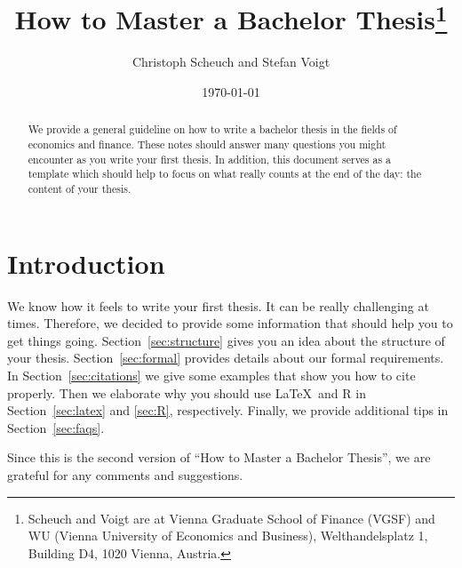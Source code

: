 \documentclass[a4paper, 12pt]{article}
\begin{document}
	\title{\textbf{How to Master a Bachelor Thesis}\thanks{Scheuch and Voigt are at Vienna Graduate School of Finance (VGSF) and WU (Vienna University of Economics and Business), Welthandelsplatz 1, Building D4, 1020 Vienna, Austria.}}
	\date{\today}
	\author{Christoph Scheuch and Stefan Voigt}
	\clearpage
	\maketitle
	\thispagestyle{empty}
	\begin{abstract}
		We provide a general guideline on how to write a bachelor thesis in the fields of economics and finance. These notes should answer many questions you might encounter as you write your first thesis. In addition, this document serves as a template which should help to focus on what really counts at the end of the day: the content of your thesis.
	\end{abstract}
	
	\newpage
	\pagestyle{plain}
	\setcounter{page}{1}
	\tableofcontents
	\listoffigures
	\listoftables
	
	\newpage
	\pagestyle{plain}
	\setcounter{page}{1}
		
	\section{Introduction}
	We know how it feels to write your first thesis. It can be really challenging at times. Therefore, we decided to provide some information that should help you to get things going. Section~\ref{sec:structure} gives you an idea about the structure of your thesis. Section~\ref{sec:formal} provides details about our formal requirements. In Section~\ref{sec:citations} we give some examples that show you how to cite properly. Then we elaborate why you should use \LaTeX\ and R in Section~\ref{sec:latex} and \ref{sec:R}, respectively. Finally, we provide additional tips in Section~\ref{sec:faqs}.
	
	Since this is the second version of ``How to Master a Bachelor Thesis'', we are grateful for any comments and suggestions. 
	
\end{document}
